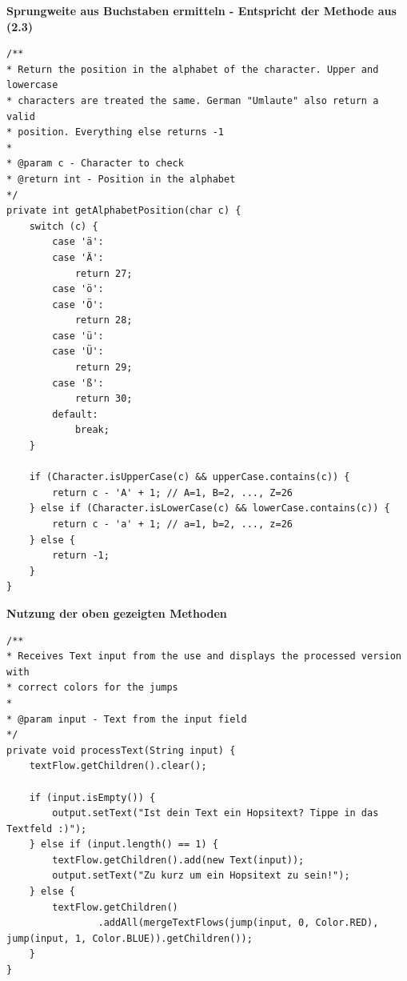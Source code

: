 \documentclass[a4paper,10pt,ngerman]{scrartcl}
\begin{document}
\newpage

\textbf{Sprungweite aus Buchstaben ermitteln - Entspricht der Methode aus (2.3)}
\begin{lstlisting}
/**
* Return the position in the alphabet of the character. Upper and lowercase
* characters are treated the same. German "Umlaute" also return a valid
* position. Everything else returns -1
* 
* @param c - Character to check
* @return int - Position in the alphabet
*/
private int getAlphabetPosition(char c) {
    switch (c) {
        case 'ä':
        case 'Ä':
            return 27;
        case 'ö':
        case 'Ö':
            return 28;
        case 'ü':
        case 'Ü':
            return 29;
        case 'ß':
            return 30;
        default:
            break;
    }

    if (Character.isUpperCase(c) && upperCase.contains(c)) {
        return c - 'A' + 1; // A=1, B=2, ..., Z=26
    } else if (Character.isLowerCase(c) && lowerCase.contains(c)) {
        return c - 'a' + 1; // a=1, b=2, ..., z=26
    } else {
        return -1;
    }
}
\end{lstlisting}

\textbf{Nutzung der oben gezeigten Methoden}
\begin{lstlisting}
/**
* Receives Text input from the use and displays the processed version with
* correct colors for the jumps
* 
* @param input - Text from the input field
*/
private void processText(String input) {
    textFlow.getChildren().clear();

    if (input.isEmpty()) {
        output.setText("Ist dein Text ein Hopsitext? Tippe in das Textfeld :)");
    } else if (input.length() == 1) {
        textFlow.getChildren().add(new Text(input));
        output.setText("Zu kurz um ein Hopsitext zu sein!");
    } else {
        textFlow.getChildren()
                .addAll(mergeTextFlows(jump(input, 0, Color.RED), jump(input, 1, Color.BLUE)).getChildren());
    }
}
\end{lstlisting}
\end{document}
